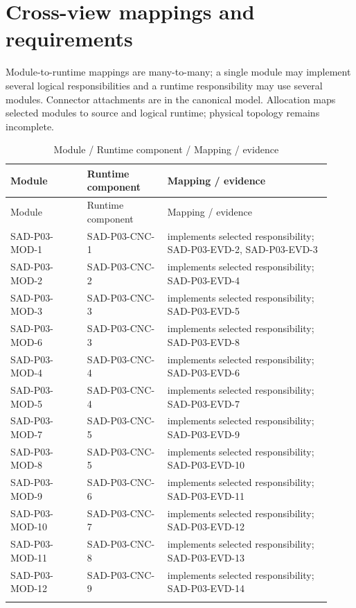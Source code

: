 \documentclass[10pt,letterpaper]{article}
\begin{document}
\section{Cross-view mappings and requirements}
Module-to-runtime mappings are many-to-many; a single module may implement several logical responsibilities and a runtime responsibility may use several modules. Connector attachments are in the canonical model. Allocation maps selected modules to source and logical runtime; physical topology remains incomplete.
\begin{longtable}{@{}>{\raggedright\arraybackslash}p{0.22\linewidth}>{\raggedright\arraybackslash}p{0.23\linewidth}>{\raggedright\arraybackslash}p{0.47\linewidth}@{}}
\caption{Module / Runtime component / Mapping / evidence}\\
\toprule Module & Runtime component & Mapping / evidence\\\midrule\endfirsthead
\toprule Module & Runtime component & Mapping / evidence\\\midrule\endhead
SAD-P03-MOD-1 & SAD-P03-CNC-1 & implements selected responsibility; SAD-P03-EVD-2, SAD-P03-EVD-3\\\addlinespace
SAD-P03-MOD-2 & SAD-P03-CNC-2 & implements selected responsibility; SAD-P03-EVD-4\\\addlinespace
SAD-P03-MOD-3 & SAD-P03-CNC-3 & implements selected responsibility; SAD-P03-EVD-5\\\addlinespace
SAD-P03-MOD-6 & SAD-P03-CNC-3 & implements selected responsibility; SAD-P03-EVD-8\\\addlinespace
SAD-P03-MOD-4 & SAD-P03-CNC-4 & implements selected responsibility; SAD-P03-EVD-6\\\addlinespace
SAD-P03-MOD-5 & SAD-P03-CNC-4 & implements selected responsibility; SAD-P03-EVD-7\\\addlinespace
SAD-P03-MOD-7 & SAD-P03-CNC-5 & implements selected responsibility; SAD-P03-EVD-9\\\addlinespace
SAD-P03-MOD-8 & SAD-P03-CNC-5 & implements selected responsibility; SAD-P03-EVD-10\\\addlinespace
SAD-P03-MOD-9 & SAD-P03-CNC-6 & implements selected responsibility; SAD-P03-EVD-11\\\addlinespace
SAD-P03-MOD-10 & SAD-P03-CNC-7 & implements selected responsibility; SAD-P03-EVD-12\\\addlinespace
SAD-P03-MOD-11 & SAD-P03-CNC-8 & implements selected responsibility; SAD-P03-EVD-13\\\addlinespace
SAD-P03-MOD-12 & SAD-P03-CNC-9 & implements selected responsibility; SAD-P03-EVD-14\\\addlinespace

\end{longtable}
\end{document}

